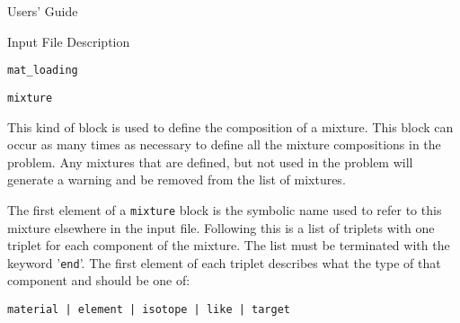 \begin{chapter}{Users' Guide\label{app:user.guide}}
\begin{section}{Input File Description\label{app:user.input}}
\begin{subsection}{\texttt{mat\_loading}\label{app:user.input.loading}}
    \end{subsection}
 

    \begin{subsection}{\texttt{mixture}\label{app:user.input.mix}}
      
      This kind of block is used to define the composition of a
      mixture.  This block can occur as many times as necessary to
      define all the mixture compositions in the problem.  Any
      mixtures that are defined, but not used in the problem will
      generate a warning and be removed from the list of mixtures.
      
      The first element of a \texttt{mixture} block is the symbolic
      name used to refer to this mixture elsewhere in the input file.
      Following this is a list of triplets with one triplet for each
      component of the mixture.  The list must be terminated with the
      keyword '\texttt{end}'.  The first element of each triplet
      describes what the type of that component and should be one of:
      \begin{center}
        \texttt{material | element | isotope | like | target}
      \end{center}


\end{subsection}
\end{section}
\end{chapter}
